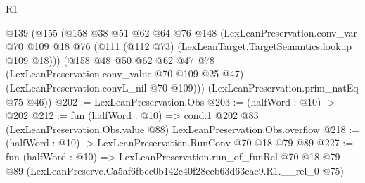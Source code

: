 \begin{lexlean}{R1}
\begin{coremodule}
  @139
    (@155
      (@158
        @38
        @51
        @62
        @64
        @76
        @148
        (LexLeanPreservation.conv_var
          @70
          @109
          @18
          @76
          (@111 (@112 @73) (LexLeanTarget.TargetSemantics.lookup @109 @18)))
        (@158
          @48
          @50
          @62
          @62
          @47
          @78
          (LexLeanPreservation.conv_value @70 @109 @25 @47)
          (LexLeanPreservation.convL_nil @70 @109)))
      (LexLeanPreservation.prim_natEq @75 @46))
@202 := LexLeanPreservation.Obs
@203 := (halfWord : @10) -> @202
@212 := fun (halfWord : @10) =>
  cond.{1} @202 @83 (LexLeanPreservation.Obs.value @88) LexLeanPreservation.Obs.overflow
@218 := (halfWord : @10) -> LexLeanPreservation.RunConv @70 @18 @79 @89
@227 := fun (halfWord : @10) =>
  LexLeanPreservation.run_of_funRel
    @70
    @18
    @79
    @89
    (LexLeanPreserve.Ca5af6fbec0b142c40f28ecb63d63cae9.R1.__rel_0 @75)
\end{coremodule}
\end{lexlean}
